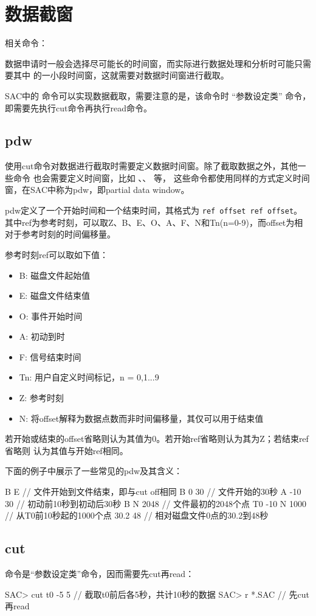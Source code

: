 \section{数据截窗}
相关命令：

数据申请时一般会选择尽可能长的时间窗，而实际进行数据处理和分析时可能只需要其中
的一小段时间窗，这就需要对数据时间窗进行截取。

SAC中的  命令可以实现数据截取，需要注意的是，该命令时
``参数设定类'' 命令，即需要先执行cut命令再执行read命令。

\subsection{pdw}
\label{subsec:pdw}
使用cut命令对数据进行截取时需要定义数据时间窗。除了截取数据之外，其他一些命令
也会需要定义时间窗，比如 、、 等，
这些命令都使用同样的方式定义时间窗，在SAC中称为pdw，即partial data window。

pdw定义了一个开始时间和一个结束时间，其格式为 \texttt{ref offset ref offset}。
其中ref为参考时刻，可以取Z、B、E、O、A、F、N和Tn(n=0-9)，而offset为相对于参考时刻的时间偏移量。

参考时刻ref可以取如下值：
\begin{itemize}
\item B: 磁盘文件起始值
\item E: 磁盘文件结束值
\item O: 事件开始时间
\item A: 初动到时
\item F: 信号结束时间
\item Tn: 用户自定义时间标记，n = 0,1...9
\item Z: 参考时刻
\item N: 将offset解释为数据点数而非时间偏移量，其仅可以用于结束值
\end{itemize}

若开始或结束的offset省略则认为其值为0。若开始ref省略则认为其为Z；若结束ref省略则
认为其值与开始ref相同。

下面的例子中展示了一些常见的pdw及其含义：
\begin{SACCode}
 B E            // 文件开始到文件结束，即与cut off相同
 B 0 30         // 文件开始的30秒
 A -10 30       // 初动前10秒到初动后30秒
 B N 2048       // 文件最初的2048个点
 T0 -10 N 1000  // 从T0前10秒起的1000个点
 30.2 48        // 相对磁盘文件0点的30.2到48秒
\end{SACCode}

\subsection{cut}
命令是``参数设定类''命令，因而需要先cut再read：
\begin{SACCode}
SAC> cut t0 -5 5        // 截取t0前后各5秒，共计10秒的数据
SAC> r *.SAC            // 先cut再read
\end{SACCode}
